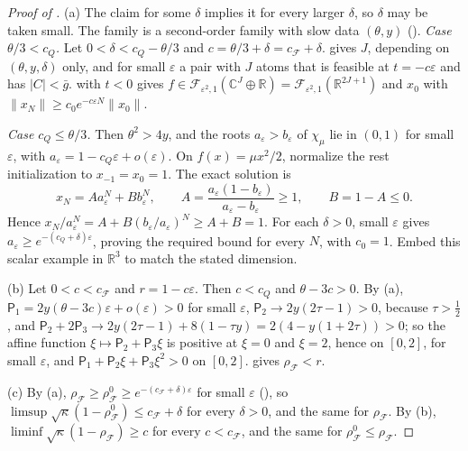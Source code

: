 \documentclass[11pt]{article}
\theoremstyle{definition}
\theoremstyle{remark}
\newcommand{\R}{\mathbb R}
\newcommand{\C}{\mathbb C}
\newcommand{\cF}{\mathcal F}
\newcommand{\sfP}{\mathsf P}
\newcommand{\norm}[1]{\lVert #1\rVert}
\newcommand{\rhoF}{\rho_{\cF}}
\newcommand{\rhoz}{\rho_{\cF}^{0}}
\newcommand{\cQ}{c_{Q}}
\newcommand{\cFF}{c_{\cF}}
\begin{document}
\begin{proof}[Proof of ]
(a) The claim for some \(\delta\) implies it for every larger \(\delta\), so \(\delta\) may be taken small.  The family is a second-order
family with slow data \((\theta,y)\) ().
\emph{Case \(\theta/3<\cQ\).}  Let \(0<\delta<\cQ-\theta/3\) and \(c=\theta/3+\delta=\cFF+\delta\).   gives \(J\), depending on
\((\theta,y,\delta)\) only, and for small \(\varepsilon\) a pair with \(J\) atoms that is feasible at \(t=-c\varepsilon\) and has \(|C|<\bar g\).
 with \(t<0\) gives \(f\in\cF_{\varepsilon^2,1}(\C^J\oplus\R)=\cF_{\varepsilon^2,1}(\R^{2J+1})\) and
\(x_0\) with \(\norm{x_N}\ge c_0e^{-c\varepsilon N}\norm{x_0}\).


\emph{Case \(\cQ\le\theta/3\).}  Then \(\theta^2>4y\), and the
roots \(a_\varepsilon>b_\varepsilon\) of \(\chi_\mu\) lie in
\((0,1)\) for small \(\varepsilon\), with
\(a_\varepsilon=1-\cQ\varepsilon+o(\varepsilon)\).
On \(f(x)=\mu x^2/2\), normalize the rest initialization to
\(x_{-1}=x_0=1\).  The exact solution is
\[
x_N=Aa_\varepsilon^N+Bb_\varepsilon^N,\qquad
A=\frac{a_\varepsilon(1-b_\varepsilon)}{a_\varepsilon-b_\varepsilon}
\ge1,\qquad B=1-A\le0.
\]
Hence \(x_N/a_\varepsilon^N
=A+B(b_\varepsilon/a_\varepsilon)^N\ge A+B=1\).
For each \(\delta>0\), small \(\varepsilon\) gives
\(a_\varepsilon\ge e^{-(\cQ+\delta)\varepsilon}\), proving the
required bound for every \(N\), with \(c_0=1\).
Embed this scalar example in \(\R^3\) to match the stated dimension.

(b) Let \(0<c<\cFF\) and \(r=1-c\varepsilon\).  Then \(c<\cQ\) and \(\theta-3c>0\).  By (a),
\(\sfP_1=2y(\theta-3c)\varepsilon+o(\varepsilon)>0\) for small \(\varepsilon\), \(\sfP_2\to2y(2\tau-1)>0\), because \(\tau>\frac12\), and
\(\sfP_2+2\sfP_3\to2y(2\tau-1)+8(1-\tau y)=2(4-y(1+2\tau))>0\); so the affine function
\(\xi\mapsto\sfP_2+\sfP_3\xi\) is positive at \(\xi=0\) and \(\xi=2\), hence on \([0,2]\), for small \(\varepsilon\), and
\(\sfP_1+\sfP_2\xi+\sfP_3\xi^2>0\) on \([0,2]\).   gives \(\rhoF<r\).

(c) By (a), \(\rhoF\ge\rhoz\ge e^{-(\cFF+\delta)\varepsilon}\) for small \(\varepsilon\) (), so
\(\limsup\sqrt\kappa(1-\rhoz)\le\cFF+\delta\) for every \(\delta>0\), and the same for \(\rhoF\).  By (b),
\(\liminf\sqrt\kappa(1-\rhoF)\ge c\) for every \(c<\cFF\), and the same for \(\rhoz\le\rhoF\).
\end{proof}
\end{document}
